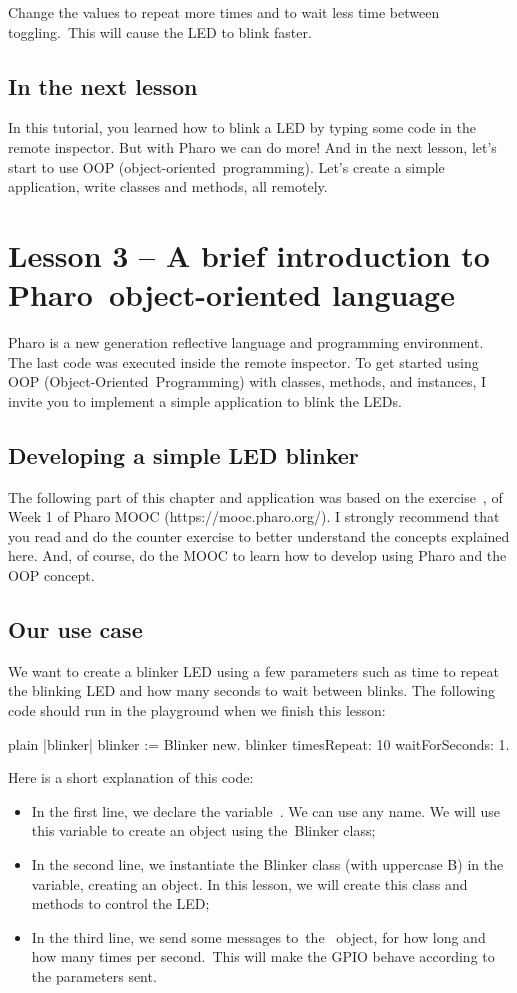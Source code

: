 \documentclass[10pt,twoside,english]{_support/latex/sbabook/sbabook}
\begin{document}
Change the values to repeat more times and to wait less time between toggling. This will cause the LED to blink faster.
\section{In the next lesson}
In this tutorial, you learned how to blink a LED by typing some code in the remote inspector. But with Pharo we can do more! And in the next lesson, let’s start to use OOP (object-oriented programming). Let's create a simple application, write classes and methods, all remotely.
\chapter{Lesson 3 – A brief introduction to Pharo object-oriented language}
Pharo is a new generation reflective language and programming environment. The last code was executed inside the remote inspector. To get started using OOP (Object-Oriented Programming) with classes, methods, and instances, I invite you to implement a simple application to blink the LEDs.
\section{Developing a simple LED blinker}
The following part of this chapter and application was based on the exercise , of Week 1 of Pharo MOOC (https://mooc.pharo.org/). I strongly recommend that you read and do the counter exercise to better understand the concepts explained here. And, of course, do the MOOC to learn how to develop using Pharo and the OOP concept.
\section{Our use case}
We want to create a blinker LED using a few parameters such as time to repeat the blinking LED and how many seconds to wait between blinks. The following code should run in the playground when we finish this lesson:

\begin{displaycode}{plain}
|blinker|
blinker := Blinker new.
blinker timesRepeat: 10 waitForSeconds: 1.
\end{displaycode}

Here is a short explanation of this code:

\begin{itemize}
\item In the first line, we declare the variable . We can use any name. We will use this variable to create an object using the Blinker class;
\item In the second line, we instantiate the Blinker class (with uppercase B) in the  variable, creating an object. In this lesson, we will create this class and methods to control the LED;
\item In the third line, we send some messages to the  object, for how long and how many times per second. This will make the GPIO behave according to the parameters sent.
\end{itemize}
\end{document}
